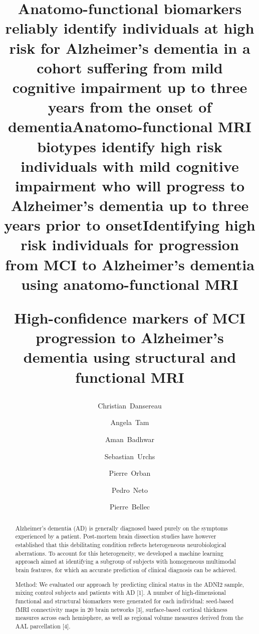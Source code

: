 \documentclass[authoryear]{elsarticle}
\begin{document}
\begin{frontmatter}


\title{High-confidence markers of MCI progression to Alzheimer’s dementia using structural and functional MRI
\title{Anatomo-functional biomarkers reliably identify individuals at high risk for Alzheimer’s dementia in a cohort suffering from mild cognitive impairment up to three years from the onset of dementia}

\title{Anatomo-functional MRI biotypes identify high risk individuals with mild cognitive impairment who will progress to Alzheimer’s dementia up to three years prior to onset}

\title{Identifying high risk individuals for progression from MCI to Alzheimer’s dementia using anatomo-functional MRI}

\author[a,b]{Christian~Dansereau}
\author[c]{Angela~Tam}
\author[a,b]{Aman~Badhwar}
\author[c]{Sebastian~Urchs}
\author[a]{Pierre~Orban}
\author[a]{Pedro~Neto}
\author[a,b]{Pierre~Bellec}
\address[a]{Centre de Recherche de l'Institut Universitaire de G\'eriatrie de Montr\'eal, Montr\'eal, CA}
\address[b]{D\'epartement d'Informatique et de recherche op\'erationnelle, Universit\'e de Montr\'eal, Montr\'eal,CA}
\address[c]{Integrated Program in Neuroscience, McGill University, Montr\'eal,CA}
%

\begin{abstract}
Alzheimer’s dementia (AD) is generally diagnosed based purely on the symptoms experienced by a patient. Post-mortem brain dissection studies have however established that this debilitating condition reflects heterogeneous neurobiological aberrations. To account for this heterogeneity, we developed a machine learning approach aimed at identifying a subgroup of subjects with homogeneous multimodal brain features, for which an accurate prediction of clinical diagnosis can be achieved. 

Method: 
We evaluated our approach by predicting clinical status in the ADNI2 sample, mixing control subjects and patients with AD [1]. A number of high-dimensional functional and structural biomarkers were generated for each individual: seed-based fMRI connectivity maps in 20 brain networks [3], surface-based cortical thickness measures across each hemisphere, as well as regional volume measures derived from the AAL parcellation [4]. 


\end{abstract}}
\end{frontmatter}
\end{document}
